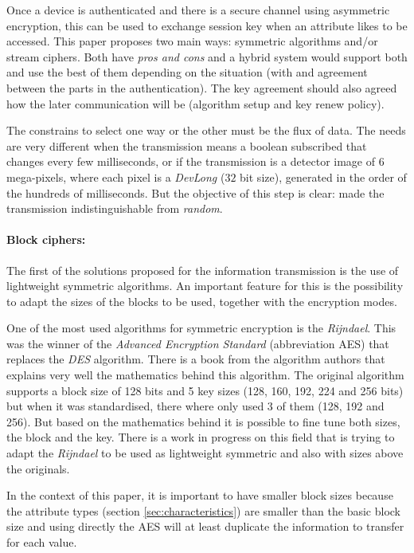 \documentclass[10pt,a4paper,twoside]{llncs}
\begin{document}
Once a device is authenticated and there is a secure channel using asymmetric encryption, this can be used to exchange session key when an attribute likes to be accessed. This paper proposes two main ways: symmetric algorithms and/or stream ciphers. Both have \emph{pros and cons} and a hybrid system would support both and use the best of them depending on the situation (with and agreement between the parts in the authentication). The key agreement should also agreed how the later communication will be (algorithm setup and key renew policy).

The constrains to select one way or the other must be the flux of data. The needs are very different when the transmission means a boolean subscribed that changes every few milliseconds, or if the transmission is a detector image of 6 mega-pixels, where each pixel is a \emph{DevLong} ($32$ bit size), generated in the order of the hundreds of milliseconds. But the objective of this step is clear: made the transmission indistinguishable from \emph{random}.

\paragraph{Block ciphers:} The first of the solutions proposed for the information transmission is the use of lightweight symmetric algorithms. An important feature for this is the possibility to adapt the sizes of the blocks to be used, together with the encryption modes.

One of the most used algorithms for symmetric encryption is the \emph{Rijndael}. This was the winner of the \emph{Advanced Encryption Standard} (abbreviation AES) \cite{AES-FIPS} that replaces the \emph{DES} algorithm. There is a book \cite{Daemen:2002:DR:560131} from the algorithm authors that explains very well the mathematics behind this algorithm. The original algorithm supports a block size of 128 bits and 5 key sizes (128, 160, 192, 224 and 256 bits) but when it was standardised, there where only used 3 of them (128, 192 and 256). But based on the mathematics behind it is possible to fine tune both sizes, the block and the key. There is a work in progress on this field \cite{gRijndael} that is trying to adapt the \emph{Rijndael} to be used as lightweight symmetric and also with sizes above the originals.

In the context of this paper, it is important to have smaller block sizes because the attribute types (section \ref{sec:characteristics}) are smaller than the basic block size and using directly the AES will at least duplicate the information to transfer for each value.
\end{document}
